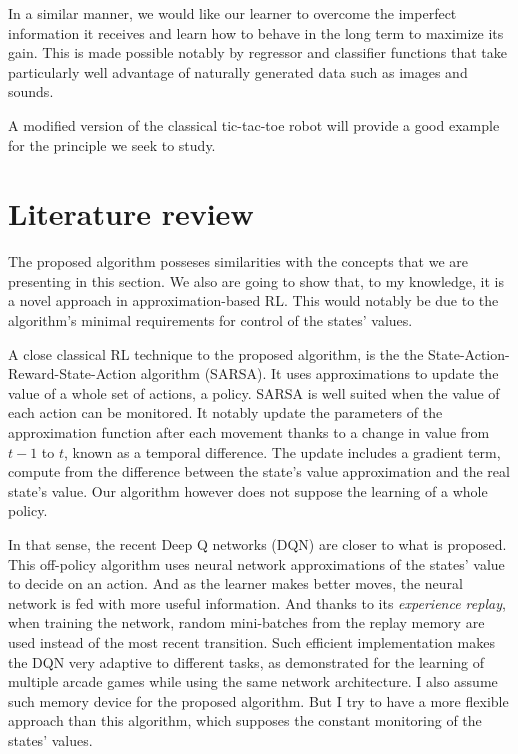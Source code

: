 \documentclass[letterpaper, 10.5 pt, conference]{ieeeconf}
\begin{document}
In a similar manner, we would like our learner to overcome the imperfect information it receives and learn how to behave in the long term to maximize its gain. This is made possible notably by regressor and classifier functions that take particularly well advantage of naturally generated data such as images and sounds.

A modified version of the classical tic-tac-toe robot will provide a good example for the principle we seek to study.

\section{Literature review}

The proposed algorithm posseses similarities with the concepts that we are presenting in this section. We also are going to show that, to my knowledge, it is a novel approach in approximation-based RL. This would notably be due to the algorithm's minimal requirements for control of the states' values.

A close classical RL technique to the proposed algorithm, is the the State-Action-Reward-State-Action algorithm (SARSA). It uses approximations to update the value of a whole set of actions, a policy. SARSA is well suited when the value of each action can be monitored. It notably update the parameters of the approximation function after each movement thanks to a change in value from $t-1$ to $t$, known as a temporal difference. The update includes a gradient term, compute from the difference between the state's value approximation and the real state's value. Our algorithm however does not suppose the learning of a whole policy.

In that sense, the recent Deep Q networks (DQN) are closer to what is proposed. This off-policy algorithm uses neural network approximations of the states' value to decide on an action. And as the learner makes better moves, the neural network is fed with more useful information. And thanks to its \textit{experience replay}, when training the network, random mini-batches from the replay memory are used instead of the most recent transition. Such efficient implementation makes the DQN very adaptive to different tasks, as demonstrated for the learning of multiple arcade games while using the same network architecture. I also assume such memory device for the proposed algorithm. But I try to have a more flexible approach than this algorithm, which supposes the constant monitoring of the states' values. 
\end{document}
